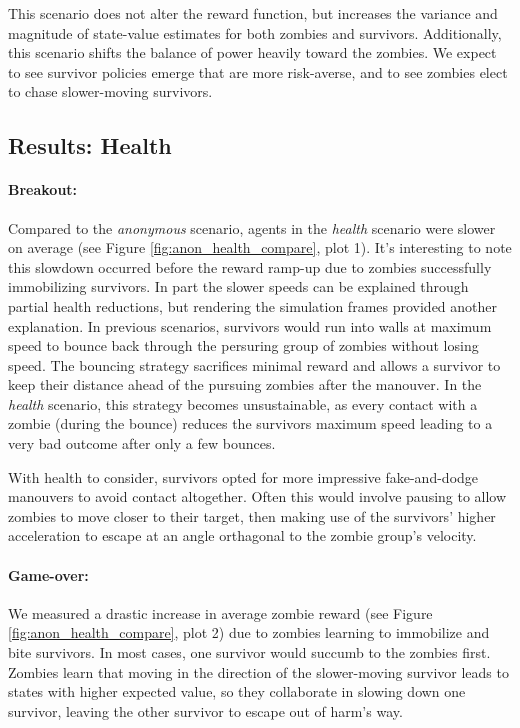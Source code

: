 \documentclass[11pt,a4paper]{article}
\begin{document}
This scenario does not alter the reward function, but increases the variance and magnitude of state-value estimates for both zombies and survivors.
Additionally, this scenario shifts the balance of power heavily toward the zombies.
We expect to see survivor policies emerge that are more risk-averse, and to see zombies elect to chase slower-moving survivors.

\subsection{Results: Health}

\paragraph{Breakout:} Compared to the \emph{anonymous} scenario, agents in the \emph{health} scenario were slower on average (see Figure \ref{fig:anon_health_compare}, plot 1).
It's interesting to note this slowdown occurred before the reward ramp-up due to zombies successfully immobilizing survivors.
In part the slower speeds can be explained through partial health reductions, but rendering the simulation frames provided another explanation.
In previous scenarios, survivors would run into walls at maximum speed to bounce back through the persuring group of zombies without losing speed.
The bouncing strategy sacrifices minimal reward and allows a survivor to keep their distance ahead of the pursuing zombies after the manouver.
In the \emph{health} scenario, this strategy becomes unsustainable, as every contact with a zombie (during the bounce) reduces the survivors maximum speed
leading to a very bad outcome after only a few bounces.

With health to consider, survivors opted for more impressive fake-and-dodge manouvers to avoid contact altogether.
Often this would involve pausing to allow zombies to move closer to their target, then making use of the survivors' higher acceleration to escape at an angle orthagonal to the zombie group's velocity.

\paragraph{Game-over:} We measured a drastic increase in average zombie reward (see Figure \ref{fig:anon_health_compare}, plot 2) due to zombies learning to immobilize and bite survivors.
In most cases, one survivor would succumb to the zombies first.
Zombies learn that moving in the direction of the slower-moving survivor leads to states with higher expected value, so they collaborate in slowing down one survivor, leaving the other survivor to escape out of harm's way.
\end{document}
